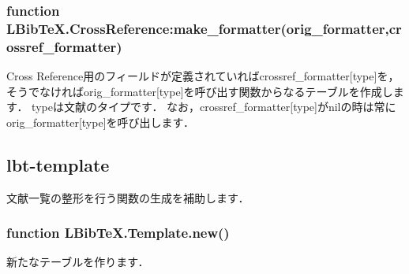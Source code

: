 \documentclass[dvipdfmx,a4paper]{jsarticle}
\begin{document}
\subsubsection{function LBibTeX.CrossReference:make\_formatter(orig\_formatter,crossref\_formatter)}
Cross Reference用のフィールドが定義されていればcrossref\_formatter[type]を，そうでなければorig\_formatter[type]を呼び出す関数からなるテーブルを作成します．
typeは文献のタイプです．
なお，crossref\_formatter[type]がnilの時は常にorig\_formatter[type]を呼び出します．

\subsection{lbt-template}
文献一覧の整形を行う関数の生成を補助します．

\subsubsection{function LBibTeX.Template.new()}
新たなテーブルを作ります．
\end{document}
